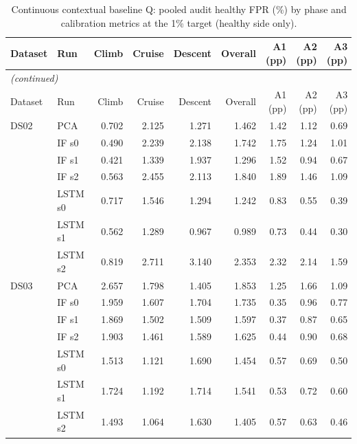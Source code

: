 \begin{footnotesize}
\begin{longtable}{llrrrrrrr}
\caption{Continuous contextual baseline Q: pooled audit healthy FPR (\%) by phase and calibration metrics at the 1\% target (healthy side only).}\label{tab:s19_baseline_phase}\\
\toprule
Dataset & Run & Climb & Cruise & Descent & Overall & A1 (pp) & A2 (pp) & A3 (pp) \\
\midrule
\endfirsthead
\multicolumn{9}{l}{\emph{(continued)}}\\
\toprule
Dataset & Run & Climb & Cruise & Descent & Overall & A1 (pp) & A2 (pp) & A3 (pp) \\
\midrule
\endhead
\bottomrule
\endfoot
DS02 & PCA & 0.702 & 2.125 & 1.271 & 1.462 & 1.42 & 1.12 & 0.69 \\
 & IF s0 & 0.490 & 2.239 & 2.138 & 1.742 & 1.75 & 1.24 & 1.01 \\
 & IF s1 & 0.421 & 1.339 & 1.937 & 1.296 & 1.52 & 0.94 & 0.67 \\
 & IF s2 & 0.563 & 2.455 & 2.113 & 1.840 & 1.89 & 1.46 & 1.09 \\
 & LSTM s0 & 0.717 & 1.546 & 1.294 & 1.242 & 0.83 & 0.55 & 0.39 \\
 & LSTM s1 & 0.562 & 1.289 & 0.967 & 0.989 & 0.73 & 0.44 & 0.30 \\
 & LSTM s2 & 0.819 & 2.711 & 3.140 & 2.353 & 2.32 & 2.14 & 1.59 \\
\midrule
DS03 & PCA & 2.657 & 1.798 & 1.405 & 1.853 & 1.25 & 1.66 & 1.09 \\
 & IF s0 & 1.959 & 1.607 & 1.704 & 1.735 & 0.35 & 0.96 & 0.77 \\
 & IF s1 & 1.869 & 1.502 & 1.509 & 1.597 & 0.37 & 0.87 & 0.65 \\
 & IF s2 & 1.903 & 1.461 & 1.589 & 1.625 & 0.44 & 0.90 & 0.68 \\
 & LSTM s0 & 1.513 & 1.121 & 1.690 & 1.454 & 0.57 & 0.69 & 0.50 \\
 & LSTM s1 & 1.724 & 1.192 & 1.714 & 1.541 & 0.53 & 0.72 & 0.60 \\
 & LSTM s2 & 1.493 & 1.064 & 1.630 & 1.405 & 0.57 & 0.63 & 0.46 \\
\end{longtable}
\end{footnotesize}
